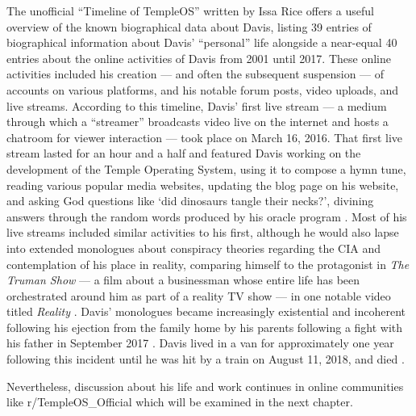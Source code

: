 \documentclass[Draft.tex]{subfiles}
\begin{document}
The unofficial ``Timeline of TempleOS'' written by Issa Rice
\parencite*{Rice18} offers a useful overview of the known
biographical data about Davis, listing 39 entries of biographical information
about Davis' ``personal'' life alongside a near-equal 40 entries about
the online activities of Davis from 2001 until 2017.
These online activities included his creation --- and
often the subsequent suspension --- of accounts on various platforms,
and his notable forum posts, video uploads, and live streams.
According to this timeline, Davis' first live stream ---
a medium through which a ``streamer'' broadcasts video live on the internet
and hosts a chatroom for viewer interaction --- took place on March 16, 2016.
That first live stream lasted for an hour and a half and featured Davis
working on the development of the Temple Operating System,
using it to compose a hymn tune, reading various popular media websites,
updating the blog page on his website, and asking God questions
like `did dinosaurs tangle their necks?', divining answers through the
random words produced by his oracle program
\parencite[59:05]{FirstLiveStream}.
Most of his live streams included similar activities to his first,
although he would also lapse into extended monologues about
conspiracy theories regarding the CIA and contemplation of his place in
reality, comparing himself to the protagonist in \textit{The Truman Show}
--- a film about a businessman whose entire life has been
orchestrated around him as part of a reality TV show ---
in one notable video titled \textit{Reality} \parencite{Reality}.
Davis' monologues became increasingly existential and incoherent following
his ejection from the family home by his parents following a fight
with his father in September 2017 \parencite{Homeless}.
Davis lived in a van for approximately one year following this incident
until he was hit by a train on August 11, 2018, and died \parencite{Cecil18}.

Nevertheless, discussion about his life and work continues in
online communities like r/TempleOS\_Official
which will be examined in the next chapter.
\end{document}
